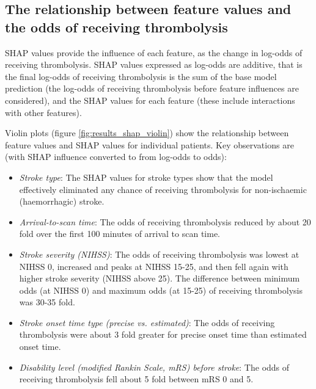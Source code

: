 \begin{itemize}
\subsection{The relationship between feature values and the odds of receiving thrombolysis}

SHAP values provide the influence of each feature, as the change in log-odds of receiving thrombolysis. SHAP values expressed as log-odds are additive, that is the final log-odds of receiving thrombolysis is the sum of the base model prediction (the log-odds of receiving thrombolysis before feature influences are considered), and the SHAP values for each feature (these include interactions with other features).

Violin plots (figure \ref{fig:results_shap_violin}) show the relationship between feature values and SHAP values for  individual patients. Key observations are (with SHAP influence converted to from log-odds to odds):

\begin{itemize}
    \item \emph{Stroke type}: The SHAP values for stroke types show that the model effectively eliminated any chance of receiving thrombolysis for non-ischaemic (haemorrhagic) stroke.
    \item \emph{Arrival-to-scan time}: The odds of receiving thrombolysis reduced by about 20 fold over the first 100 minutes of arrival to scan time.
    \item \emph{Stroke severity (NIHSS)}: The odds of receiving thrombolysis was lowest at NIHSS 0, increased and peaks at NIHSS 15-25, and then fell again with higher stroke severity (NIHSS above 25). The difference between minimum odds (at NIHSS 0) and maximum odds (at 15-25) of receiving thrombolysis was 30-35 fold.
    \item \emph{Stroke onset time type (precise vs. estimated)}: The odds of receiving thrombolysis were about 3 fold greater for precise onset time than estimated onset time.
    \item \emph{Disability level (modified Rankin Scale, mRS) before stroke}: The odds of receiving thrombolysis fell about 5 fold between mRS 0 and 5.
\end{itemize}



\end{itemize}
